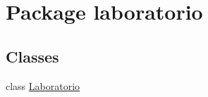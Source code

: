 \hypertarget{namespacelaboratorio}{}\section{Package laboratorio}
\label{namespacelaboratorio}
\subsection*{Classes}
\begin{DoxyCompactItemize}
\item 
class \mbox{\hyperlink{classlaboratorio_1_1_laboratorio}{Laboratorio}}
\end{DoxyCompactItemize}
